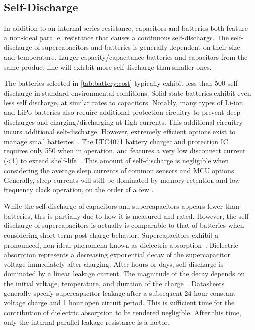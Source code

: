 \subsection{Self-Discharge}
In addition to an internal series resistance, capacitors and batteries both feature a non-ideal parallel resistance that causes a continuous self-discharge.
The self-discharge of supercapacitors and batteries is generally dependent on their size and temperature. Larger capacity/capacitance batteries and capacitors from the same product line will exhibit more self discharge than smaller ones. 

The batteries selected in \cref{tab:battery:cost} typically exhibit less than 500\ssi{\nano\ampere} self-discharge in standard environmental conditions. Solid-state batteries exhibit even less self discharge, at similar rates to capacitors. Notably, many types of Li-ion and LiPo batteries also require additional protection circuitry to prevent deep discharges and charging/discharging at high currents. This additional circuitry incurs additional self-discharge. However, extremely efficient options exist to manage small batteries~\cite{ltc4071Datasheet,bq25505,adp5091}. The LTC4071 battery charger and protection IC requires only 550\ssi{\nano\ampere} when in operation, and features a very low disconnect current (<1\ssi{\nano\ampere}) to extend shelf-life~\cite{ltc4071Datasheet}.
This amount of self-discharge is negligible when considering the average sleep currents of common sensors and MCU options. Generally, sleep currents will still be dominated by memory retention and low frequency clock operation, on the order of a few \ssi{\micro\ampere}. 

While the self discharge of capacitors and supercapacitors appears lower than batteries, this is partially due to how it is measured and rated. However, the self discharge of supercapacitors is actually is comparable to that of batteries when considering short term post-charge behavior.
Supercapacitors exhibit a pronounced, non-ideal phenomena known as dielectric absorption~\cite{kundert2008modeling}. Dielectric absorption represents a decreasing exponential decay of the supercapacitor voltage immediately after charging. After hours or days, self-discharge is dominated by a linear leakage current. The magnitude of the decay depends on the initial voltage, temperature, and duration of the charge~\cite{kowal2011detailed}. Datasheets generally specify supercapacitor leakage after a subsequent 24 hour constant voltage charge and 1 hour open circuit period. This is sufficient time for the contribution of dielectric absorption to be rendered negligible. After this time, only the internal parallel leakage resistance is a factor.

